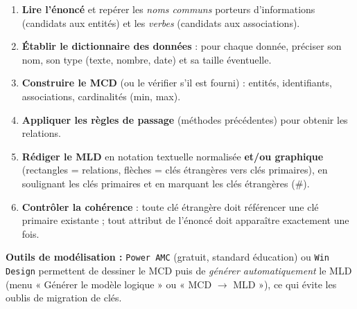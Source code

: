 \documentclass[11pt]{article}
\begin{document}
\begin{methode}
\begin{enumerate}
\item \textbf{Lire l'énoncé} et repérer les \emph{noms communs} porteurs d'informations (candidats aux entités) et les \emph{verbes} (candidats aux associations).
\item \textbf{Établir le dictionnaire des données} : pour chaque donnée, préciser son nom, son type (texte, nombre, date) et sa taille éventuelle.
\item \textbf{Construire le MCD} (ou le vérifier s'il est fourni) : entités, identifiants, associations, cardinalités (min, max).
\item \textbf{Appliquer les règles de passage} (méthodes précédentes) pour obtenir les relations.
\item \textbf{Rédiger le MLD} en notation textuelle normalisée \textbf{et/ou graphique} (rectangles = relations, flèches = clés étrangères vers clés primaires), en soulignant les clés primaires et en marquant les clés étrangères (\#).
\item \textbf{Contrôler la cohérence} : toute clé étrangère doit référencer une clé primaire existante ; tout attribut de l'énoncé doit apparaître exactement une fois.
\end{enumerate}
\textbf{Outils de modélisation :} \texttt{Power AMC} (gratuit, standard éducation) ou \texttt{Win Design} permettent de dessiner le MCD puis de \emph{générer automatiquement} le MLD (menu « Générer le modèle logique » ou « MCD $\to$ MLD »), ce qui évite les oublis de migration de clés.
\end{methode}
\end{document}
